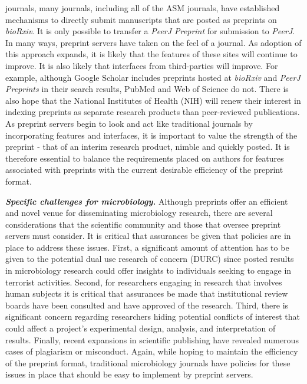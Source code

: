\documentclass[11pt,]{article}
\begin{document}
journals, many journals, including all of the ASM journals, have
established mechanisms to directly submit manuscripts that are posted as
preprints on \emph{bioRxiv}. It is only possible to transfer a
\emph{PeerJ Preprint} for submission to \emph{PeerJ}. In many ways,
preprint servers have taken on the feel of a journal. As adoption of
this approach expands, it is likely that the features of these sites
will continue to improve. It is also likely that interfaces from
third-parties will improve. For example, although Google Scholar
includes preprints hosted at \emph{bioRxiv} and \emph{PeerJ Preprints}
in their search results, PubMed and Web of Science do not. There is also
hope that the National Institutes of Health (NIH) will renew their
interest in indexing preprints as separate research products than
peer-reviewed publications. As preprint servers begin to look and act
like traditional journals by incorporating features and interfaces, it
is important to value the strength of the preprint - that of an interim
research product, nimble and quickly posted. It is therefore essential
to balance the requirements placed on authors for features associated
with preprints with the current desirable efficiency of the preprint
format.

\textbf{\emph{Specific challenges for microbiology.}} Although preprints
offer an efficient and novel venue for disseminating microbiology
research, there are several considerations that the scientific community
and those that oversee preprint servers must consider. It is critical
that assurances be given that policies are in place to address these
issues. First, a significant amount of attention has to be given to the
potential dual use research of concern (DURC) since posted results in
microbiology research could offer insights to individuals seeking to
engage in terrorist activities. Second, for researchers engaging in
research that involves human subjects it is critical that assurances be
made that institutional review boards have been consulted and have
approved of the research. Third, there is significant concern regarding
researchers hiding potential conflicts of interest that could affect a
project's experimental design, analysis, and interpretation of results.
Finally, recent expansions in scientific publishing have revealed
numerous cases of plagiarism or misconduct. Again, while hoping to
maintain the efficiency of the preprint format, traditional microbiology
journals have policies for these issues in place that should be easy to
implement by preprint servers.
\end{document}
